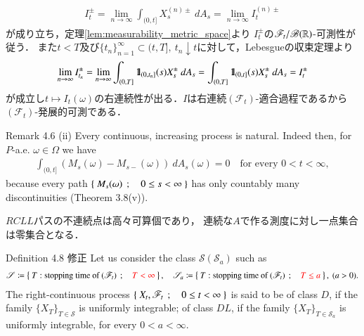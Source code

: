 \begin{prf}
		\begin{align}
			I^{\pm}_t = \lim_{n \to \infty} \int_{(0,t]} X^{(n)\pm}_s\ dA_s
			= \lim_{n \to \infty} I^{(n)\pm}_t
		\end{align}
		が成り立ち，定理\ref{lem:measurability_metric_space}より
		$I^{\pm}_t$の$\mathscr{F}_t/\mathscr{B}(\mathbb{R})$-可測性が従う．
		また$t<T$及び$\{t_n\}_{n=1}^\infty \subset (t,T],\ t_n \downarrow t$に対して，Lebesgueの収束定理より
		\begin{align}
			\lim_{n \to \infty} I^\pm_{t_n}
			= \lim_{n \to \infty} \int_{(0,T]} \mbox{1}\hspace{-0.25em}\mbox{l}_{(0,t_n]}(s)X^\pm_s\ dA_s
			= \int_{(0,T]} \mbox{1}\hspace{-0.25em}\mbox{l}_{(0,t]}(s)X^\pm_s\ dA_s
			= I^\pm_t
		\end{align}
		が成立し$t \longmapsto I_t(\omega)$の右連続性が出る．$I$は右連続$(\mathscr{F}_t)$-適合過程であるから
		$(\mathscr{F}_t)$-発展的可測である．
		\QED
	\end{prf}
	
	\begin{itembox}[l]{Remark 4.6 (ii)}
		Every continuous, increasing process is natural. Indeed then, for $P$-a.e. $\omega \in \Omega$
		we have
		\begin{align}
			\int_{(0,t]} (M_s(\omega)-M_{s-}(\omega))\ dA_s(\omega) = 0
			\quad \mbox{for every $0 < t < \infty$},
		\end{align}
		because every path $\left\{\ M_s(\omega)\ \, ; \quad 0 \leq s < \infty\ \right\}$ has only countably many discontinuities
		(Theorem 3.8(v)).
	\end{itembox}
	
	\begin{prf}
		$RCLL$パスの不連続点は高々可算個であり，
		連続な$A$で作る測度に対し一点集合は零集合となる．
		\QED
	\end{prf}
	
	\begin{itembox}[l]{Definition 4.8 修正}
		Let us consider the class $\mathscr{S}(\mathscr{S}_a)$ such as
		\begin{align}
			\mathscr{S} \coloneqq \left\{\ T:\mbox{stopping time of $(\mathscr{F}_t)$}\ \, ; \quad \textcolor{red}{T < \infty}\ \right\},
			\quad \mathscr{S}_a \coloneqq \left\{\ T:\mbox{stopping time of $(\mathscr{F}_t)$}\ \, ; \quad \textcolor{red}{T \leq a}\ \right\},\ (a > 0).
		\end{align}
		The right-continuous process $\left\{\ X_t,\mathscr{F}_t\ \, ; \quad 0 \leq t < \infty\ \right\}$ is said to be 
		of class $D$, if the family $\{X_T\}_{T \in \mathscr{S}}$ is uniformly integrable;
		of class $DL$, if the family $\{X_T\}_{T \in \mathscr{S}_a}$ is uniformly integrable,
		for every $0 < a < \infty$.
	\end{itembox}
	

